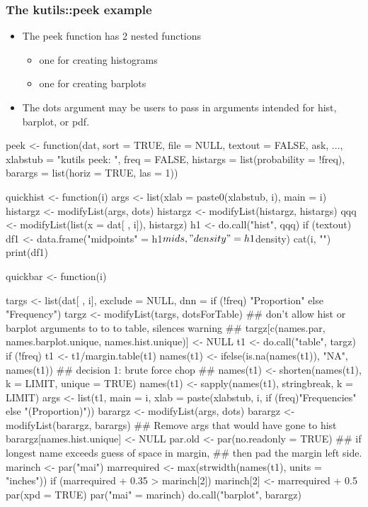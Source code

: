 \documentclass[11pt,english]{beamer}
\def\Sweavesize{\scriptsize}
\begin{document}
\begin{frame}
  \frametitle{The kutils::peek example}
  
  \begin{itemize}
  \item The peek function has 2 nested functions
    \begin{itemize}
    \item one for creating histograms
    \item  one for creating barplots
    \end{itemize}
    
  \item The dots argument may be users to pass in
    arguments intended for hist, barplot, or pdf.
  \end{itemize}
  
\def\Sweavesize{\tiny}
\begin{Sinput}
peek <-
    function(dat, sort = TRUE, file = NULL, textout = FALSE, ask, ...,
             xlabstub = "kutils peek: ", freq = FALSE,
             histargs = list(probability = !freq),
             barargs = list(horiz = TRUE, las = 1))
{
    quickhist <- function(i){
        args <- list(xlab = paste0(xlabstub, i),
                     main = i)
        histargz <- modifyList(args, dots)
        histargz <- modifyList(histargz, histargs)
        qqq <- modifyList(list(x = dat[ , i]), histargz)
        h1 <- do.call("hist", qqq)
        if (textout){
            df1 <- data.frame("midpoints" = h1$mids, "density" = h1$density)
            cat(i, "\n")
            print(df1)
        }
    }
    
    quickbar <- function(i){
        targs <- list(dat[ , i], exclude = NULL,
                      dnn =  if (!freq) "Proportion" else "Frequency")
        targz <- modifyList(targs, dotsForTable)
        ## don't allow hist or barplot arguments to to to table, silences warning
        ## targz[c(names.par, names.barplot.unique, names.hist.unique)] <- NULL
        t1 <- do.call("table", targz)
        if (!freq) t1 <- t1/margin.table(t1)
        names(t1) <- ifelse(is.na(names(t1)), "NA", names(t1))
        ## decision 1: brute force chop
        ## names(t1) <- shorten(names(t1), k = LIMIT, unique = TRUE)
        names(t1) <- sapply(names(t1), stringbreak, k = LIMIT)
        args <- list(t1, main = i,
                     xlab = paste(xlabstub,  i, if (freq)"Frequencies" else "(Proportion)"))
        barargz <- modifyList(args, dots)
        barargz <- modifyList(barargz, barargs)
        ## Remove args that would have gone to hist
        barargz[names.hist.unique] <- NULL
        par.old <- par(no.readonly = TRUE)
        ## if longest name exceeds guess of space in margin,
        ## then pad the margin left side.
        marinch <- par("mai")
        marrequired <- max(strwidth(names(t1), units = "inches"))
        if (marrequired + 0.35 > marinch[2]) {
            marinch[2] <- marrequired + 0.5
            par(xpd = TRUE)
            par("mai" = marinch)
        }
        do.call("barplot", barargz)
                
}}
\end{Sinput}
\end{frame}
\end{document}

